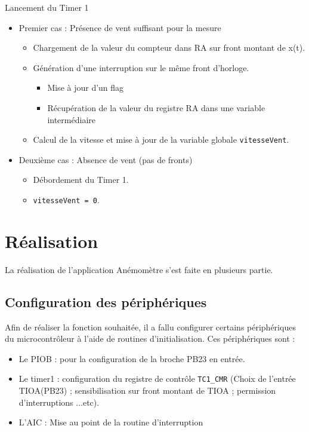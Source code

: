 \documentclass[a4paper]{report}
\begin{document}
Lancement du Timer 1
\begin{itemize}
\item Premier cas : Présence de vent suffisant pour la mesure
	\begin{itemize}
		\item Chargement de la valeur du compteur dans RA sur front montant de x(t).
		\item Génération d'une interruption sur le même front d'horloge.
			\begin{itemize}
				\item Mise à jour d'un flag
				\item Récupération de la valeur du registre RA dans une variable intermédiaire
			\end{itemize}
		\item Calcul de la vitesse et mise à jour de la variable globale \texttt{vitesseVent}.
	\end{itemize}
\item Deuxième cas : Absence de vent (pas de fronts)
	\begin{itemize}
		\item Débordement du Timer 1.
		\item \texttt{vitesseVent = 0}.
	\end{itemize}
\end{itemize}

\section{Réalisation}
La réalisation de l'application Anémomètre s'est faite en plusieurs partie.
\subsection{Configuration des périphériques}
Afin de réaliser la fonction souhaitée, il a fallu configurer certains périphériques du microcontrôleur à l'aide de routines d'initialisation. Ces périphériques sont :
\begin{itemize}
\item Le PIOB : pour la configuration de la broche PB23 en entrée.
\item Le timer1 : configuration du registre de contrôle \texttt{TC1\_CMR}
	(Choix de l'entrée TIOA(PB23) ; sensibilisation sur front montant de TIOA ; permission d'interruptions ...etc).
\item L'AIC : Mise au point de la routine d'interruption
\end{itemize}
\end{document}
